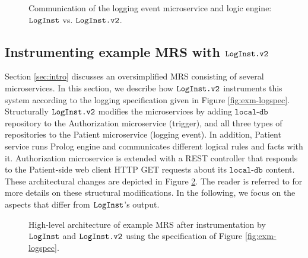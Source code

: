 \begin{figure} 
	\centering
	\caption{Communication of the logging event microservice and logic engine: $\texttt{LogInst}$ vs. $\texttt{LogInst.v2}$.}
	\label{fig:mrs-prolog-comm}
\end{figure}


\subsection{Instrumenting example MRS with $\texttt{LogInst.v2}$} \label{sec:cstudy}
Section \ref{sec:intro} discusses an oversimplified MRS consisting of several microservices. In this section, we describe how $\texttt{LogInst.v2}$ instruments this system according to the logging specification given in Figure \ref{fig:exm-logspec}. Structurally $\texttt{LogInst.v2}$ modifies the microservices by adding $\texttt{local-db}$ repository to the Authorization microservice (trigger), and all three types of repositories to the Patient microservice (logging event). In addition, Patient service runs Prolog engine and communicates different logical rules and facts with it. Authorization microservice is extended with a REST controller that responds to the Patient-side web client HTTP GET requests about its $\texttt{local-db}$ content. These architectural changes are depicted in Figure \ref{fig:mrs-mics-target}. The reader is referred to \cite{stpsa21} for more details on these structural modifications. In the following, we focus on the aspects that differ from $\texttt{LogInst}$'s output. 

\begin{figure} 
	\centering
	\caption{High-level architecture of example MRS after instrumentation by $\texttt{LogInst}$ and $\texttt{LogInst.v2}$ using the specification of Figure \ref{fig:exm-logspec}.}
	\label{fig:mrs-mics-target}
\end{figure}

